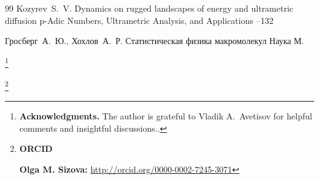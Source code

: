 \begin{thebibliography}{99}
\by Kozyrev~S.~V.
\paper Dynamics on rugged landscapes of energy and ultrametric diffusion
\jour p-Adic Numbers, Ultrametric Analysis, and Applications
--132

\by Гросберг~А.~Ю., Хохлов~А.~Р.
\book Статистическая физика макромолекул
\publ Наука
\publaddr М.

\end{thebibliography}

\RuDate

\pagebreak




\makeentitle

\thanks{\textbf{Acknowledgments.} 
The author is grateful to   	 Vladik A.~Avetisov  for helpful comments and insightful discussions..}



\thanks{{\bf ORCID}

{\bf Olga M. Sizova:} \url{http://orcid.org/0000-0002-7245-3071}

}


\EngRef

